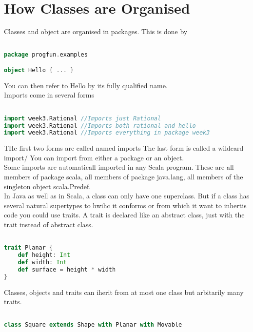 \documentclass[10pt, a4paper]{report}
\begin{document}
\section{How Classes are Organised}

Classes and object are organised in packages. This is done by

\begin{lstlisting}[language=scala]

package progfun.examples

object Hello { ... }

\end{lstlisting}

You can then refer to Hello by its fully qualified name.\\

Imports come in several forms

\begin{lstlisting}[language=scala]

import week3.Rational //Imports just Rational
import week3.Rational //Imports both rational and hello
import week3.Rational //Imports everything in package week3

\end{lstlisting}

THe first two forms are called named imports
The last form is called a wildcard import/ You can import from either a package or an object.\\

Some imports are automaticall imported in any Scala program. These are all members of package scala, all members of package java.lang, all members of the singleton object scala.Predef.\\

In Java as well as in Scala, a class can only have one superclass. But if a class has several natural supertypes to hwihc it conforms or from which it want to inhertis code you could use traits. A trait is declared like an abstract class, just with the trait instead of abstract class.

\begin{lstlisting}[language=scala]

trait Planar {
	def height: Int
	def width: Int
	def surface = height * width
}

\end{lstlisting}

Classes, objects and traits can iherit from at most one class but arbitarily many traits.

\begin{lstlisting}[language=scala]

class Square extends Shape with Planar with Movable

\end{lstlisting}
\end{document}
